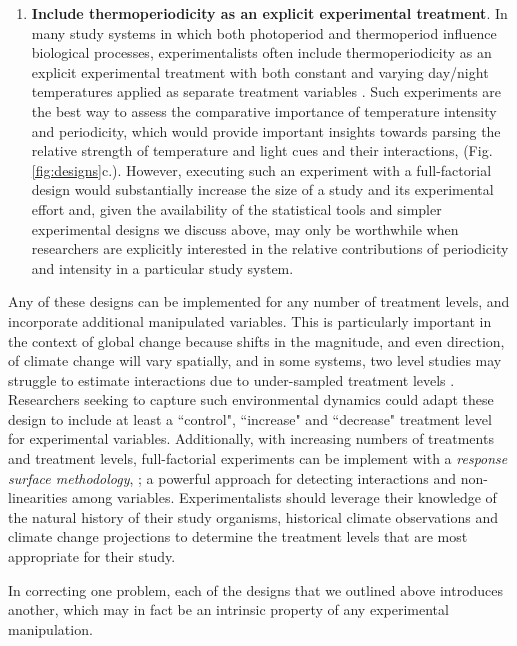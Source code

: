 \documentclass[11pt]{article}
\begin{document}
\begin{enumerate}
\item \textbf{Include thermoperiodicity as an explicit experimental treatment}. 
In many study systems in which both photoperiod and thermoperiod influence biological processes, experimentalists often include thermoperiodicity as an explicit experimental treatment with both constant and varying day/night temperatures applied as separate treatment variables \citep[e.g.,][]{Zaslavksi_1995}. Such experiments are the best way to assess the comparative importance of temperature intensity and periodicity, which would provide important insights towards parsing the relative strength of temperature and light cues and their interactions,  (Fig. \ref{fig:designs}c.). However, executing such an experiment with a full-factorial design would substantially increase the size of a study and its experimental effort and, given the availability of the statistical tools and simpler experimental designs we discuss above, may only be worthwhile when researchers are explicitly interested in the relative contributions of periodicity and intensity in a particular study system.
\end{enumerate}

Any of these designs can be implemented for any number of treatment levels, and incorporate additional manipulated variables. This is particularly important in the context of global change because shifts in the magnitude, and even direction, of climate change will vary spatially, and in some systems, two level studies may struggle to estimate interactions due to under-sampled treatment levels \citep{Collins:2022ve}. Researchers seeking to capture such environmental dynamics could adapt these design to include at least a ``control", ``increase" and ``decrease" treatment level for experimental variables. Additionally, with increasing numbers of treatments and treatment levels, full-factorial experiments can be implement with a \emph{response surface methodology}, \citep[e.g,][]{SCHUBERT200984,Begoude:2007td}; a powerful approach for detecting interactions and non-linearities among variables. Experimentalists should leverage their knowledge of the natural history of their study organisms, historical climate observations and climate change projections to determine the treatment levels that are most appropriate for their study.

In correcting one problem, each of the designs that we outlined above introduces another, which may in fact be an intrinsic property of any experimental manipulation. 
\end{document}
